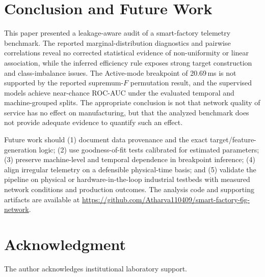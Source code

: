\documentclass[conference]{IEEEtran}
\begin{document}
\section{Conclusion and Future Work}
\label{sec:conclusion}
This paper presented a leakage-aware audit of a smart-factory telemetry benchmark. The reported marginal-distribution diagnostics and pairwise correlations reveal no corrected statistical evidence of non-uniformity or linear association, while the inferred efficiency rule exposes strong target construction and class-imbalance issues. The Active-mode breakpoint of 20.69\,ms is not supported by the reported supremum-$F$ permutation result, and the supervised models achieve near-chance ROC-AUC under the evaluated temporal and machine-grouped splits. The appropriate conclusion is not that network quality of service has no effect on manufacturing, but that the analyzed benchmark does not provide adequate evidence to quantify such an effect.

Future work should (1) document data provenance and the exact target/feature-generation logic; (2) use goodness-of-fit tests calibrated for estimated parameters; (3) preserve machine-level and temporal dependence in breakpoint inference; (4) align irregular telemetry on a defensible physical-time basis; and (5) validate the pipeline on physical or hardware-in-the-loop industrial testbeds with measured network conditions and production outcomes. The analysis code and supporting artifacts are available at \url{https://github.com/Atharva110409/smart-factory-6g-network}.

\section*{Acknowledgment}
The author acknowledges institutional laboratory support.



\end{document}
